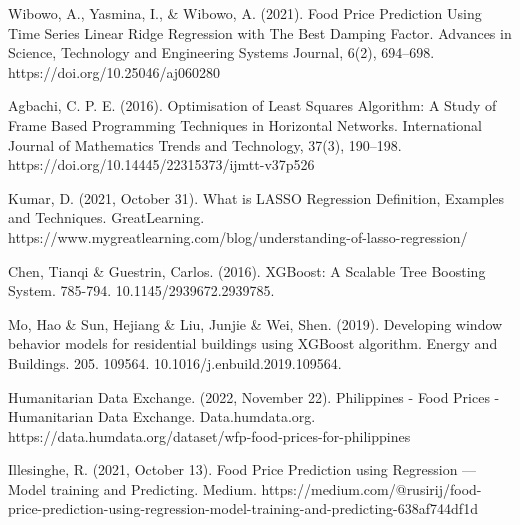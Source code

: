 \documentclass[runningheads]{llncs}
\begin{document}
\begin{thebibliography}{20}
		Wibowo, A., Yasmina, I., \& Wibowo, A. (2021). Food Price Prediction Using Time Series Linear Ridge Regression with The Best Damping Factor. Advances in Science, Technology and Engineering Systems Journal, 6(2), 694–698. https://doi.org/10.25046/aj060280
	
	
	Agbachi, C. P. E. (2016). Optimisation of Least Squares Algorithm: A Study of Frame Based Programming Techniques in Horizontal Networks. International Journal of Mathematics Trends and Technology, 37(3), 190–198. https://doi.org/10.14445/22315373/ijmtt-v37p526
	
	
	Kumar, D. (2021, October 31). What is LASSO Regression Definition, Examples and Techniques. GreatLearning. https://www.mygreatlearning.com/blog/understanding-of-lasso-regression/
	
	Chen, Tianqi \& Guestrin, Carlos. (2016). XGBoost: A Scalable Tree Boosting System. 785-794. 10.1145/2939672.2939785. 
	
	
	Mo, Hao \& Sun, Hejiang \& Liu, Junjie \& Wei, Shen. (2019). Developing window behavior models for residential buildings using XGBoost algorithm. Energy and Buildings. 205. 109564. 10.1016/j.enbuild.2019.109564.
	
	Humanitarian Data Exchange. (2022, November 22). Philippines - Food Prices - Humanitarian Data Exchange. Data.humdata.org. https://data.humdata.org/dataset/wfp-food-prices-for-philippines
	
	Illesinghe, R. (2021, October 13). Food Price Prediction using Regression — Model training and Predicting. Medium. https://medium.com/@rusirij/food-price-prediction-using-regression-model-training-and-predicting-638af744df1d
	
	

	
	
\end{thebibliography}
\end{document}
